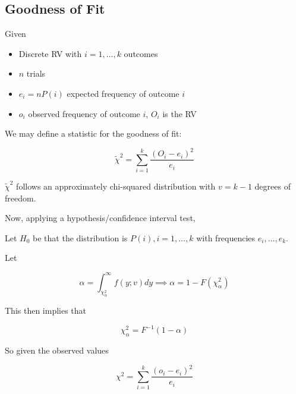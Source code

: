 \documentclass[10pt]{article}
\begin{document}
\subsection{Goodness of Fit}

Given
\begin{itemize}
	\item Discrete RV with $ i = 1, \ldots, k $ outcomes
	\item $ n $ trials
	\item $ e_i = nP(i) $ expected frequency of outcome $ i $ 
	\item $ o_i $ observed frequency of outcome $ i $, $ O_i $ is the RV
\end{itemize}

We may define a statistic for the goodness of fit:

\begin{equation}
	\tilde\chi^2 = \sum_{i=1}^{k} \frac{(O_i - e_i)^2}{e_i} 
	\label{eq:286:gd_fit_stat}
\end{equation}


$ \tilde\chi^{2} $ follows an approximately chi-squared distribution with $ v = k - 1 $ degrees of freedom.

Now, applying a hypothesis/confidence interval test,

Let $H_0$ be that the distribution is $ P(i), i = 1, \ldots, k $   with frequencies $ e_i, \ldots, e_k $.

Let

\begin{equation}
	\alpha = \int_{\chi_\alpha^2}^{\infty} f(y; v)dy \implies \alpha = 1 - F(\chi_\alpha^2)
\end{equation}

This then implies that

\begin{equation}
\chi_\alpha^2 = F^{-1} (1-\alpha) 
\end{equation}


So given the observed values


\begin{equation}
	\chi^2 = \sum_{i=1}^{k} \frac{(o_i - e_i)^2}{e_i} 
	\label{eq:286:gd_fit_obs}
\end{equation}
\end{document}
